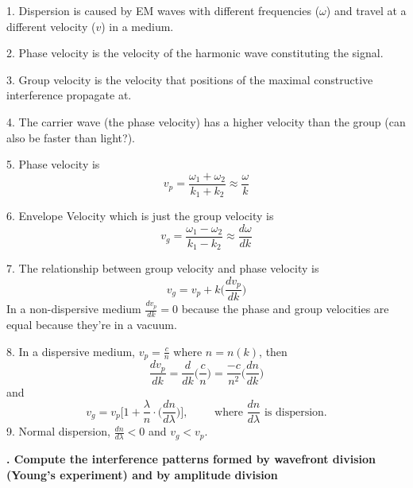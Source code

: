 \documentclass[10pt]{article}
\newcounter{counter}
\newcommand*{\question}[1]{
            \textbf{\thecounter. #1} \hfill
            \addtocounter{counter}{1}
            
            \newblock

            }
\begin{document}
{
    \begin{minipage}{\linewidth}
        1. Dispersion is caused by EM waves with different frequencies ($\omega$) and travel at a different velocity ($v$) in a medium.

        \newblock

        2. Phase velocity is the velocity of the harmonic wave constituting the signal.

        \newblock
        
        3. Group velocity is the velocity that positions of the maximal constructive interference propagate at.

        \newblock
        
        4. The carrier wave (the phase velocity) has a higher velocity than the group (can also be faster than light?).

        5. Phase velocity is \[v_p = \frac{\omega_1 + \omega_2}{k_1 + k_2} \approx \frac{\omega}{k}\]

        6. Envelope Velocity which is just the group velocity is 
        \[v_g = \frac{\omega_1 - \omega_2}{k_1 - k_2} \approx \frac{d\omega}{dk}\]

        7. The relationship between group velocity and phase velocity is 
        \[v_g = v_p+k\bigg(\frac{dv_p}{dk}\bigg)\]
        In a non-dispersive medium $\frac{dv_p}{dk} = 0$ because the phase and group velocities are equal because they're in a vacuum.

        \newblock

        8. In a dispersive medium, $v_p = \frac{c}{n}$ where $n = n(k)$, then
        \[\frac{dv_p}{dk} = \frac{d}{dk}\bigg(\frac{c}{n}\bigg) = \frac{-c}{n^2} \bigg(\frac{dn}{dk}\bigg)\]
        and 
        \[v_g = v_p\bigg[ 1 + \frac{\lambda}{n}\cdot \bigg(\frac{dn}{d\lambda}\bigg)\bigg], \qquad \text{ where $\frac{dn}{d\lambda}$ is dispersion.}\]
        9. Normal dispersion, $\frac{dn}{d\lambda} < 0$ and $v_g < v_p$.

    \end{minipage}
}

\newpage

\question{Compute the interference patterns formed by wavefront division (Young’s experiment) and
by amplitude division}
\end{document}

